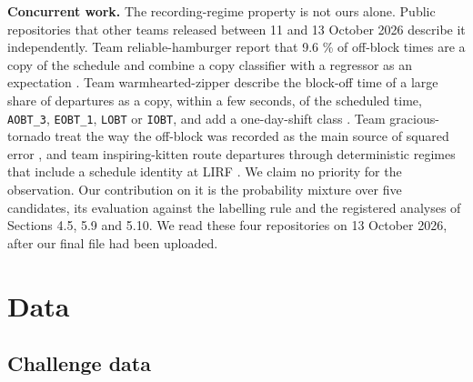 \documentclass[11pt,a4paper]{article}
\begin{document}
\textbf{Concurrent work.} The recording-regime property is not ours alone. Public repositories that other teams released between 11 and 13 October 2026 describe it independently. Team reliable-hamburger report that 9.6 \% of off-block times are a copy of the schedule and combine a copy classifier with a regressor as an expectation \autocite{reliablehamburger2026}. Team warmhearted-zipper describe the block-off time of a large share of departures as a copy, within a few seconds, of the scheduled time, \texttt{AOBT\_\allowbreak{}3}, \texttt{EOBT\_\allowbreak{}1}, \texttt{LOBT} or \texttt{IOBT}, and add a one-day-shift class \autocite{warmheartedzipper2026}. Team gracious-tornado treat the way the off-block was recorded as the main source of squared error \autocite{gracioustornado2026}, and team inspiring-kitten route departures through deterministic regimes that include a schedule identity at LIRF \autocite{inspiringkitten2026}. We claim no priority for the observation. Our contribution on it is the probability mixture over five candidates, its evaluation against the labelling rule and the registered analyses of Sections 4.5, 5.9 and 5.10. We read these four repositories on 13 October 2026, after our final file had been uploaded.

\section{Data}\label{data}

\subsection{Challenge data}\label{challenge-data}
\end{document}
